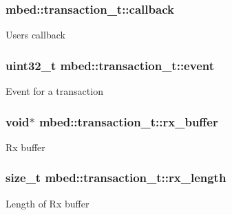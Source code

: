 \subsubsection[{\texorpdfstring{callback}{callback}}]{ mbed\+::transaction\+\_\+t\+::callback}\hypertarget{structmbed_1_1transaction__t_ac002693cf63d9a1a05789c966de5053d}{}\label{structmbed_1_1transaction__t_ac002693cf63d9a1a05789c966de5053d}
User\textquotesingle{}s callback 
\subsubsection[{\texorpdfstring{event}{event}}]{\setlength{\rightskip}{0pt plus 5cm}uint32\+\_\+t mbed\+::transaction\+\_\+t\+::event}\hypertarget{structmbed_1_1transaction__t_ab833266b58930c495adc9ca6ca6ac6ee}{}\label{structmbed_1_1transaction__t_ab833266b58930c495adc9ca6ca6ac6ee}
Event for a transaction 
\subsubsection[{\texorpdfstring{rx\+\_\+buffer}{rx_buffer}}]{\setlength{\rightskip}{0pt plus 5cm}void$\ast$ mbed\+::transaction\+\_\+t\+::rx\+\_\+buffer}\hypertarget{structmbed_1_1transaction__t_a56698177b98a193cdea584d5d9e83a51}{}\label{structmbed_1_1transaction__t_a56698177b98a193cdea584d5d9e83a51}
Rx buffer 
\subsubsection[{\texorpdfstring{rx\+\_\+length}{rx_length}}]{\setlength{\rightskip}{0pt plus 5cm}size\+\_\+t mbed\+::transaction\+\_\+t\+::rx\+\_\+length}\hypertarget{structmbed_1_1transaction__t_afefd7a94e22cadc29445edc25d33ff68}{}\label{structmbed_1_1transaction__t_afefd7a94e22cadc29445edc25d33ff68}
Length of Rx buffer 
